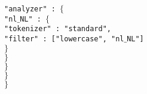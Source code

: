 \indent \indent \indent \texttt{"analyzer" : $\{$}\\
\indent \indent \indent \indent \texttt{"nl$\_$NL" : $\{$}\\
\indent \indent \indent \indent \indent \texttt{"tokenizer" : "standard",}\\
\indent \indent \indent \indent \indent \texttt{"filter" : ["lowercase", "nl$\_$NL"]}\\
\indent \indent \indent \indent \texttt{$\}$}\\
\indent \indent \indent \texttt{$\}$}\\
\indent \indent \texttt{$\}$}\\
\indent \texttt{$\}$}\\
\texttt{$\}$}\\
\clearpage
